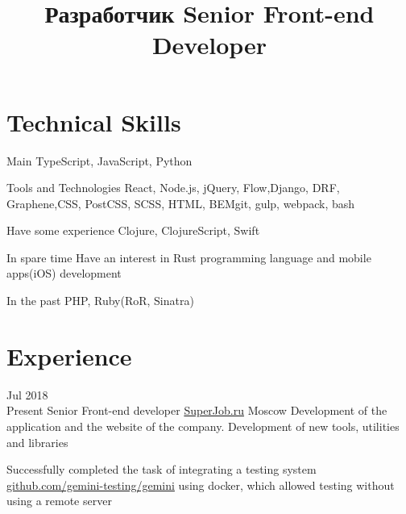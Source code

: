 \documentclass[11pt,a4paper,sans]{moderncv}
\title
    {\lang
        {Разработчик}
        {Senior Front-end Developer}}
\newcommand{\lang}[2]{#2}
\begin{document}
\maketitle

\section
    {\lang
        {Технические навыки}
        {Technical Skills}}

\cvline
    {\lang
        {Главное}
        {Main}}
    {TypeScript, JavaScript, Python}

\cvline
    {\lang
        {Использую инструменты и технологии}
        {Tools and Technologies}}
    {React, Node.js, jQuery, Flow,{\newline}Django, DRF, Graphene,{\newline}CSS, PostCSS, SCSS, HTML, BEM{\newline}git, gulp, webpack, bash}

\cvline
    {\lang
        {Имею небольшой опыт}
        {Have some experience}}
    {Clojure, ClojureScript, Swift}

\cvline
    {\lang
        {В свободное время}
        {In spare time}}
    {\lang
        {интересуюсь языком программирования Rust и мобильной разработкой iOS}
        {Have an interest in Rust programming language and mobile apps(iOS) development}\newline}

\cvline
    {\lang
        {В прошлом}
        {In the past}}
    {PHP, Ruby(RoR, Sinatra)}

\section
    {\lang
        {Опыт работы}
        {Experience}}





\cventry
    {\lang{Июл}{Jul} 2018\\\lang{по н.в.}{Present}}
    {\lang
        {Фронтенд разработчик}
        {Senior Front-end developer}}
    {\href{https://superjob.ru}{SuperJob.ru}}
    {\lang
        {Москва}
        {Moscow}}
    {}
    {\lang
        {Разработка и поддержка сайта компании, создание новых инструментов, утилит и библиотек}
        {Development of the application and the website of the company. Development of new tools, utilities and libraries}}

\cvlistitem
    {\lang
        {Успешно реализовал задачу по интеграции системы тестирования gemini(\href{https://github.com/gemini-testing/gemini}{github.com/gemini-testing/gemini}) используя docker, что позволило проводить тестирование без использования удаленного сервера}
        {Successfully completed the task of integrating a testing system \href{https://github.com/gemini-testing/gemini}{github.com/gemini-testing/gemini} using docker, which allowed testing without using a remote server}\\}
\end{document}
